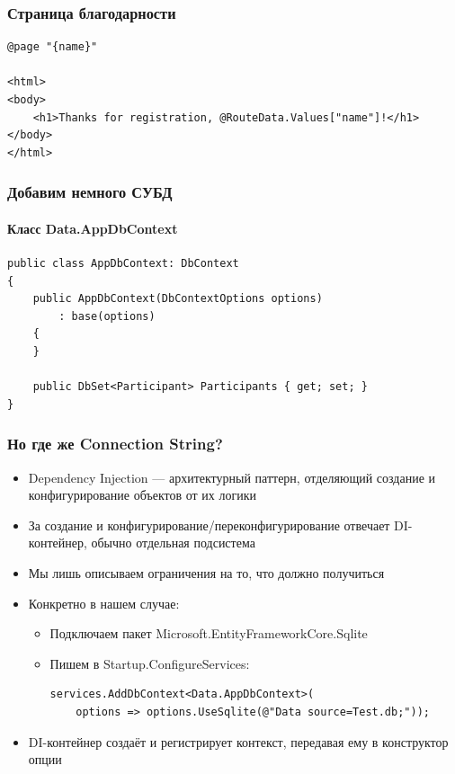 \documentclass[xetex,mathserif,serif]{beamer}
\begin{document}
	\begin{frame}[fragile]
		\frametitle{Страница благодарности}
		\begin{scriptsize}
			\begin{verbatim}
@page "{name}"

<html>
<body>
    <h1>Thanks for registration, @RouteData.Values["name"]!</h1>
</body>
</html>
			\end{verbatim}
		\end{scriptsize}
	\end{frame}

	\begin{frame}[fragile]
		\frametitle{Добавим немного СУБД}
		\framesubtitle{Класс Data.AppDbContext}
		\begin{small}
			\begin{verbatim}
public class AppDbContext: DbContext
{
    public AppDbContext(DbContextOptions options)
        : base(options)
    {
    }

    public DbSet<Participant> Participants { get; set; }
}
			\end{verbatim}
		\end{small}
	\end{frame}

	\begin{frame}[fragile]
		\frametitle{Но где же Connection String?}
		\begin{itemize}
			\item Dependency Injection --- архитектурный паттерн, отделяющий создание и конфигурирование объектов от их логики
			\item За создание и конфигурирование/переконфигурирование отвечает DI-контейнер, обычно отдельная подсистема
			\item Мы лишь описываем ограничения на то, что должно получиться
			\item Конкретно в нашем случае:
			\begin{itemize} 
				\item Подключаем пакет Microsoft.EntityFrameworkCore.Sqlite
				\item Пишем в Startup.ConfigureServices:
				\begin{verbatim}
services.AddDbContext<Data.AppDbContext>(
    options => options.UseSqlite(@"Data source=Test.db;"));
				\end{verbatim}
			\end{itemize}
			\item DI-контейнер создаёт и регистрирует контекст, передавая ему в конструктор опции
		\end{itemize}
	\end{frame}
\end{document}
